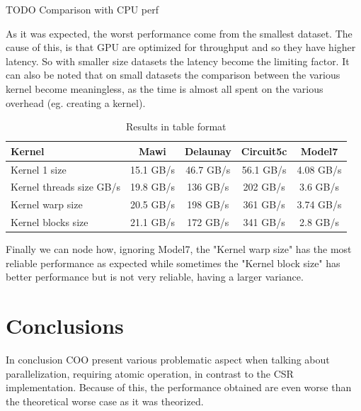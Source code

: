 \documentclass[conference]{IEEEtran}
\newcommand{\todo}[1]{\color{red} TODO #1\color{black}}
\begin{document}
\todo{Comparison with CPU perf}

As it was expected, the worst performance come from the smallest dataset. The cause of this, is that GPU are optimized for throughput and so they have higher latency. So with smaller size datasets the latency become the limiting factor. It can also be noted that on small datasets the comparison between the various kernel become meaningless, as the time is almost all spent on the various overhead (eg. creating a kernel).


\begin{table}[h!]
	\centering
	\begin{adjustbox}{width=\columnwidth}
		\begin{tabular}{lcccc}
			\toprule
			\textbf{Kernel} & \textbf{Mawi} & \textbf{Delaunay} & \textbf{Circuit5c} & \textbf{Model7}\\
			\midrule
			Kernel 1 size & 15.1 GB/s & 46.7 GB/s & 56.1 GB/s & 4.08 GB/s\\
			Kernel threads size GB/s & 19.8 GB/s & 136 GB/s & 202 GB/s & 3.6 GB/s\\
			Kernel warp size & 20.5 GB/s & 198 GB/s & 361 GB/s & 3.74 GB/s\\
			Kernel blocks size & 21.1 GB/s & 172 GB/s & 341 GB/s & 2.8 GB/s\\
			\bottomrule
		\end{tabular}
	\end{adjustbox}
	\vspace{1em}

	\caption{Results in table format}
	\label{tab:gpu-results}
\end{table}

\FloatBarrier

Finally we can node how, ignoring Model7, the "Kernel warp size" has the most reliable performance as expected while sometimes the "Kernel block size" has better performance but is not very reliable, having a larger variance.


\section{Conclusions}
In conclusion COO present various problematic aspect when talking about parallelization, requiring atomic operation, in contrast to the CSR implementation. Because of this, the performance obtained are even worse than the theoretical worse case as it was theorized.
\end{document}
